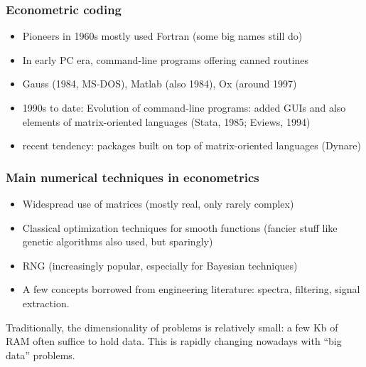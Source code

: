 \documentclass{beamer}[11pt]
\begin{document}
\begin{frame}
	\frametitle{Econometric coding}
	\begin{itemize}
		\item Pioneers in 1960s mostly used Fortran (some big names still
		do)
		\item In early PC era, command-line programs offering canned
		routines
		\item Gauss (1984, MS-DOS), Matlab (also 1984), Ox (around 1997)
		\item 1990s to date: Evolution of command-line programs: added GUIs
		and also elements of matrix-oriented languages (Stata, 1985;
		Eviews, 1994)
		\item recent tendency: packages built on top of matrix-oriented
		languages (Dynare)
	\end{itemize}
	
\end{frame}

\begin{frame}
	\frametitle{Main numerical techniques in econometrics}
	\begin{itemize}
		\item Widespread use of matrices (mostly real, only rarely complex)
		\item Classical optimization techniques for smooth functions
		(fancier stuff like genetic algorithms also used, but sparingly)
		\item RNG (increasingly popular, especially for Bayesian techniques)
		\item A few concepts borrowed from engineering literature: spectra,
		filtering, signal extraction.
	\end{itemize}
	
	Traditionally, the dimensionality of problems is relatively small: a few Kb of RAM often suffice to hold data. This is rapidly changing nowadays with ``big data'' problems.
	
\end{frame}
\end{document}
